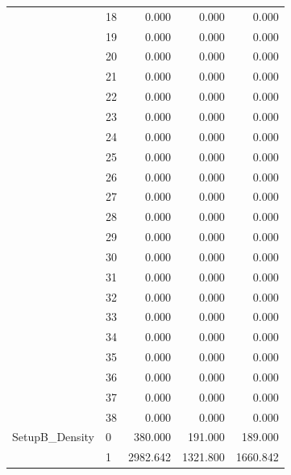 \begin{tabular}{llrrr}
               & 18 &           0.000 &           0.000 &          0.000 \\
               & 19 &           0.000 &           0.000 &          0.000 \\
               & 20 &           0.000 &           0.000 &          0.000 \\
               & 21 &           0.000 &           0.000 &          0.000 \\
               & 22 &           0.000 &           0.000 &          0.000 \\
               & 23 &           0.000 &           0.000 &          0.000 \\
               & 24 &           0.000 &           0.000 &          0.000 \\
               & 25 &           0.000 &           0.000 &          0.000 \\
               & 26 &           0.000 &           0.000 &          0.000 \\
               & 27 &           0.000 &           0.000 &          0.000 \\
               & 28 &           0.000 &           0.000 &          0.000 \\
               & 29 &           0.000 &           0.000 &          0.000 \\
               & 30 &           0.000 &           0.000 &          0.000 \\
               & 31 &           0.000 &           0.000 &          0.000 \\
               & 32 &           0.000 &           0.000 &          0.000 \\
               & 33 &           0.000 &           0.000 &          0.000 \\
               & 34 &           0.000 &           0.000 &          0.000 \\
               & 35 &           0.000 &           0.000 &          0.000 \\
               & 36 &           0.000 &           0.000 &          0.000 \\
               & 37 &           0.000 &           0.000 &          0.000 \\
               & 38 &           0.000 &           0.000 &          0.000 \\
SetupB\_Density & 0  &         380.000 &         191.000 &        189.000 \\
               & 1  &        2982.642 &        1321.800 &       1660.842 \\

\end{tabular}
